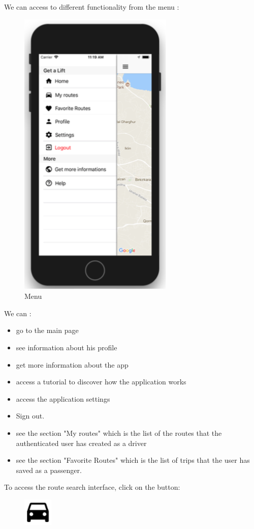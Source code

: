 We can access to different functionality from the menu :
\begin{figure}[h!]
\begin{center}
\includegraphics[scale = 0.3]{diagrams/Menu.png} 
\end{center}
\caption{Menu}
\end{figure}

We can :
\begin{itemize}
\item go to the main page
\item see information about his profile
\item get more information about the app
\item access a tutorial to discover how the application works
\item access the application settings
\item Sign out.
\item see the section "My routes" which is the list of the routes that the authenticated user has created as a driver
\item see the section "Favorite Routes" which is the list of trips that the user has saved as a passenger.
\end{itemize}

To access the route search interface, click on the button:
\begin{figure}[h!]
\begin{center}
\includegraphics[scale = 0.3]{diagrams/SearchButton.png} 
\end{center}
\end{figure}

